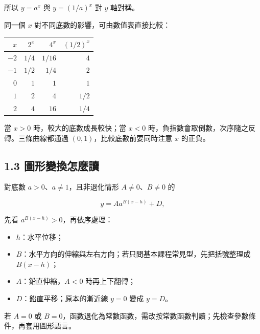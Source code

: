 \documentclass[11pt,a4paper]{article}
\newcounter{none}
\providecommand{\tightlist}{%
  \setlength{\itemsep}{0pt}\setlength{\parskip}{0pt}}
\begin{document}
所以 \(y=a^x\) 與 \(y=(1/a)^x\) 對 \(y\) 軸對稱。

同一個 \(x\) 對不同底數的影響，可由數值表直接比較：

{\def\LTcaptype{none} %
\begin{longtable}[]{@{}rrrr@{}}
\toprule\noalign{}
\(x\) & \(2^x\) & \(4^x\) & \((1/2)^x\) \\
\midrule\noalign{}
\endhead
\bottomrule\noalign{}
\endlastfoot
\(-2\) & \(1/4\) & \(1/16\) & \(4\) \\
\(-1\) & \(1/2\) & \(1/4\) & \(2\) \\
\(0\) & \(1\) & \(1\) & \(1\) \\
\(1\) & \(2\) & \(4\) & \(1/2\) \\
\(2\) & \(4\) & \(16\) & \(1/4\) \\
\end{longtable}
}

當 \(x>0\) 時，較大的底數成長較快；當 \(x<0\) 時，負指數會取倒數，次序隨之反轉。三條曲線都通過 \((0,1)\)，比較底數前要同時注意 \(x\) 的正負。

\subsection{1.3 圖形變換怎麼讀}\label{ux5716ux5f62ux8b8aux63dbux600eux9ebcux8b80}

對底數 \(a>0\)、\(a\ne1\)，且非退化情形 \(A\ne0\)、\(B\ne0\) 的

\[
y=Aa^{B(x-h)}+D,
\]

先看 \(a^{B(x-h)}>0\)，再依序處理：

\begin{itemize}
\tightlist
\item
  \(h\)：水平位移；
\item
  \(B\)：水平方向的伸縮與左右方向；若只問基本課程常見型，先把括號整理成 \(B(x-h)\)；
\item
  \(A\)：鉛直伸縮，\(A<0\) 時再上下翻轉；
\item
  \(D\)：鉛直平移；原本的漸近線 \(y=0\) 變成 \(y=D\)。
\end{itemize}

若 \(A=0\) 或 \(B=0\)，函數退化為常數函數，需改按常數函數判讀；先檢查參數條件，再套用圖形語言。
\end{document}
